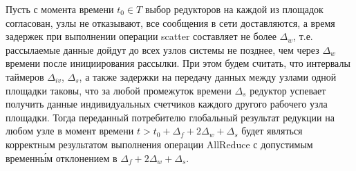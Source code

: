 \begin{theorem}
\label{ConsistentStateCorrectness}
    Пусть с момента времени $t_0 \in T$ выбор редукторов на каждой из площадок согласован, узлы не отказывают, все сообщения в сети доставляются, а время задержек при выполнении операции scatter составляет не более $\Delta_w$, т.е. рассылаемые данные дойдут до всех узлов системы не позднее, чем через $\Delta_w$ времени после инициирования рассылки. При этом будем считать, что интервалы таймеров $\Delta_{iv}$, $\Delta_s$, а также задержки на передачу данных между узлами одной площадки таковы, что за любой промежуток времени $\Delta_s$ редуктор успевает получить данные индивидуальных счетчиков каждого другого рабочего узла площадки. Тогда переданный потребителю глобальный результат редукции на любом узле в момент времени $t > t_0 + \Delta_f + 2\Delta_w + \Delta_s$ будет являться корректным результатом выполнения операции AllReduce с допустимым временн\'{ы}м отклонением в $\Delta_f + 2\Delta_w + \Delta_s$.
\end{theorem}
